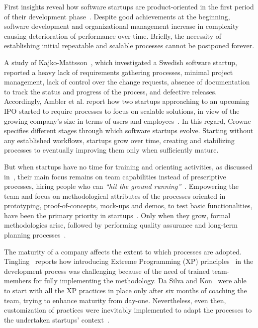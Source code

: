 \documentclass[10pt,journal,letterpaper,compsoc]{IEEEtran}
\begin{document}
First insights reveal how software startups are product-oriented in the first
period of their development phase~\cite{Heitlager2007}. Despite good
achievements at the beginning, software development and organizational
management increase in complexity~\cite{1456074,Banker1998} causing
deterioration of performance over time. Briefly, the necessity of establishing
initial repeatable and scalable processes cannot be postponed forever.

A study of Kajko-Mattsson~\cite{Kajko-Mattsson2008}, which investigated a
Swedish software startup, reported a heavy lack of requirements gathering
processes, minimal project management, lack of control over the change requests,
absence of documentation to track the status and progress of the process, and
defective releases. Accordingly, Ambler et al. report how two startups
approaching to an upcoming IPO started to require processes to focus on scalable
solutions, in view of the growing company's size in terms of users and 
employees~\cite{Ambler2002}. In this regard, Crowne~\cite{Crowne2002} specifies 
different stages through which software startups evolve. Starting without any 
established workflows, startups grow over time, creating and stabilizing 
processes to eventually improving them only when sufficiently mature.

But when startups have no time for training and orienting activities, as
discussed in~\cite{Sutton2000}, their main focus remains on team capabilities
instead of prescriptive processes, hiring people who can \textit{``hit the
ground running''}~\cite{Yoffie1999}. Empowering the team and focus on
methodological attributes of the processes oriented in prototyping, 
proof-of-concepts, mock-ups and demos, to test basic functionalities, have been  
the primary priority in startups~\cite{Camel1994a}. Only when they grow, formal
methodologies arise, followed by performing quality assurance and long-term
planning processes~\cite{Yoffie1999}.

The maturity of a company affects the extent to which processes are adopted.
Tingling~\cite{Tingling2007} reports how introducing Extreme Programming (XP)
principles~\cite{Beck:2004:EPE:1076267} in the development process was
challenging because of the need of trained team-members for fully implementing
the methodology. Da Silva and Kon~\cite{Silva2005} were able to start with all
the XP practices in place only after six months of coaching the team, trying to
enhance maturity from day-one. Nevertheless, even then, customization of
practices were inevitably implemented to adapt the processes to the undertaken
startups' context~\cite{Deias}.
\end{document}
